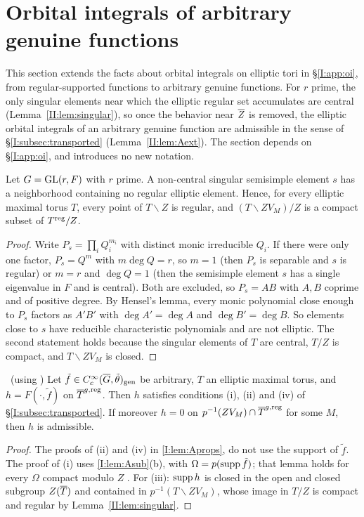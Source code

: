\section{Orbital integrals of arbitrary genuine functions}\label{II:sec:arbitrary}
This section extends the facts about orbital integrals on elliptic tori in \S\ref{I:app:oi}, from regular-supported functions to arbitrary genuine functions. For $r$ prime, the only singular elements near which the elliptic regular set accumulates are central (Lemma~\ref{II:lem:singular}), so once the behavior near $\overline{Z}$ is removed, the elliptic orbital integrals of an arbitrary genuine function are admissible in the sense of \S\ref{I:subsec:transported} (Lemma~\ref{II:lem:Aext}). The section depends on \S\ref{I:app:oi}, and introduces no new notation.

\begin{lemma}\label{II:lem:singular}
Let $G=\mathrm{GL}(r,F)$ with $r$ prime. A non-central singular semisimple element $s$ has a neighborhood containing no regular elliptic element. Hence, for every elliptic maximal torus $T$, every point of $T\smallsetminus Z$ is regular, and $(T\smallsetminus ZV_M)/Z$ is a compact subset of $T^{\mathrm{reg}}/Z$.
\end{lemma}
\begin{proof}
Write $P_s=\prod_iQ_i^{m_i}$ with distinct monic irreducible $Q_i$. If there were only one factor, $P_s=Q^m$ with $m\deg Q=r$, so $m=1$ (then $P_s$ is separable and $s$ is regular) or $m=r$ and $\deg Q=1$ (then the semisimple element $s$ has a single eigenvalue in $F$ and is central). Both are excluded, so $P_s=AB$ with $A,B$ coprime and of positive degree. By Hensel's lemma, every monic polynomial close enough to $P_s$ factors as $A'B'$ with $\deg A'=\deg A$ and $\deg B'=\deg B$. So elements close to $s$ have reducible characteristic polynomials and are not elliptic. The second statement holds because the singular elements of $T$ are central, $T/Z$ is compact, and $T\smallsetminus ZV_M$ is closed.
\end{proof}

\begin{lemma}\label{II:lem:Aext}\ (using \Ev)
Let $\tilde f\in C_c^\infty(\overline{G},\tilde\theta)_{\mathrm{gen}}$ be arbitrary, $T$ an elliptic maximal torus, and $h=F(\cdot,\tilde f)$ on $\overline{T}^{g,\mathrm{reg}}$. Then $h$ satisfies conditions (i), (ii) and (iv) of \S\ref{I:subsec:transported}. If moreover $h=0$ on $p^{-1}(ZV_M)\cap\overline{T}^{g,\mathrm{reg}}$ for some $M$, then $h$ is admissible.
\end{lemma}
\begin{proof}
The proofs of (ii) and (iv) in \cref{I:lem:Aprops}, do not use the support of $\tilde f$. The proof of (i) uses \cref{I:lem:Asub}(b), with $\Omega=p(\operatorname{supp}\tilde f)$; that lemma holds for every $\Omega$ compact modulo $Z$ \cite{HC70} \Ev. For (iii): $\operatorname{supp} h$ is closed in the open and closed subgroup $Z(\overline{T})$ and contained in $p^{-1}(T\smallsetminus ZV_M)$, whose image in $T/Z$ is compact and regular by Lemma~\ref{II:lem:singular}.
\end{proof}



